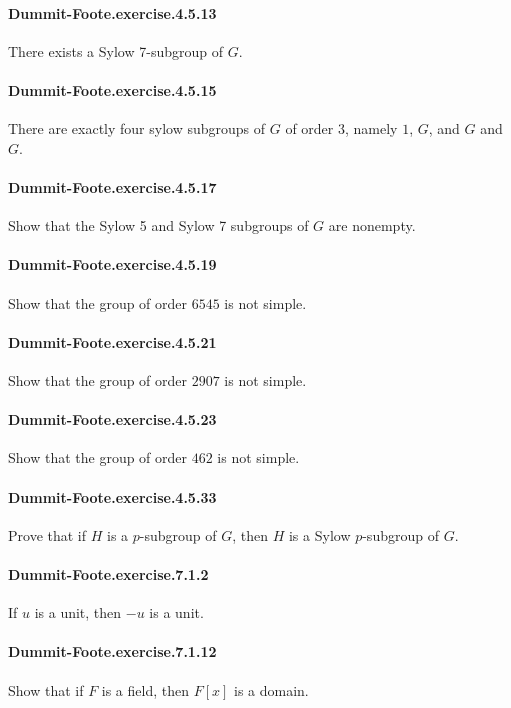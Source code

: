 \documentclass{article}
\begin{document}
\paragraph{Dummit-Foote.exercise.4.5.13} There exists a Sylow 7-subgroup of $G$.

\paragraph{Dummit-Foote.exercise.4.5.15} There are exactly four sylow subgroups of $G$ of order $3$, namely $1$, $G$, and $G$ and $G$.

\paragraph{Dummit-Foote.exercise.4.5.17} Show that the Sylow 5 and Sylow 7 subgroups of $G$ are nonempty.

\paragraph{Dummit-Foote.exercise.4.5.19} Show that the group of order $6545$ is not simple.

\paragraph{Dummit-Foote.exercise.4.5.21} Show that the group of order $2907$ is not simple.

\paragraph{Dummit-Foote.exercise.4.5.23} Show that the group of order $462$ is not simple.

\paragraph{Dummit-Foote.exercise.4.5.33} Prove that if $H$ is a $p$-subgroup of $G$, then $H$ is a Sylow $p$-subgroup of $G$.

\paragraph{Dummit-Foote.exercise.7.1.2} If $u$ is a unit, then $-u$ is a unit.

\paragraph{Dummit-Foote.exercise.7.1.12} Show that if $F$ is a field, then $F[x]$ is a domain.
\end{document}
